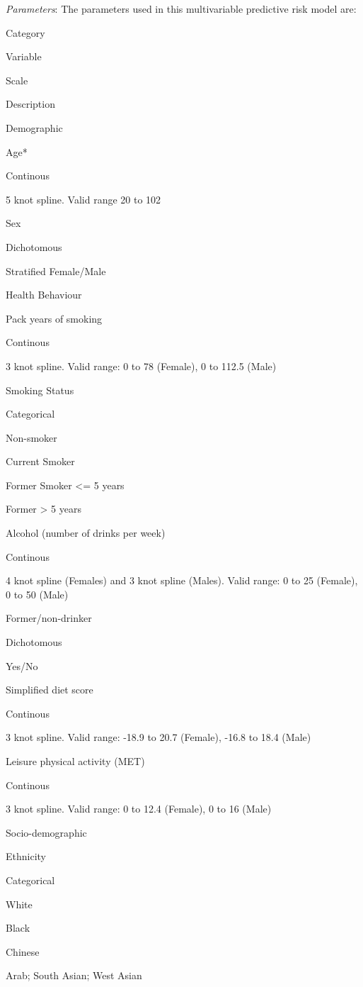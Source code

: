 \documentclass[]{book}
\begin{document}
\emph{Parameters}: The parameters used in this multivariable predictive
risk model are:

Category

Variable

Scale

Description

Demographic

Age*

Continous

5 knot spline. Valid range 20 to 102

Sex

Dichotomous

Stratified Female/Male

Health Behaviour

Pack years of smoking

Continous

3 knot spline. Valid range: 0 to 78 (Female), 0 to 112.5 (Male)

Smoking Status

Categorical

Non-smoker

Current Smoker

Former Smoker \textless{}= 5 years

Former \textgreater{} 5 years

Alcohol (number of drinks per week)

Continous

4 knot spline (Females) and 3 knot spline (Males). Valid range: 0 to 25
(Female), 0 to 50 (Male)

Former/non-drinker

Dichotomous

Yes/No

Simplified diet score

Continous

3 knot spline. Valid range: -18.9 to 20.7 (Female), -16.8 to 18.4 (Male)

Leisure physical activity (MET)

Continous

3 knot spline. Valid range: 0 to 12.4 (Female), 0 to 16 (Male)

Socio-demographic

Ethnicity

Categorical

White

Black

Chinese

Arab; South Asian; West Asian
\end{document}
